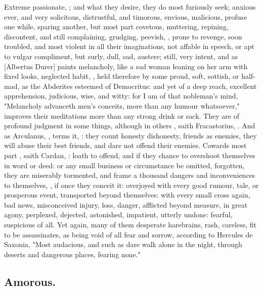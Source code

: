 {Extreme passionate, ; and what they desire,
they do most furiously seek; anxious ever, and very solicitous, distrustful,
and timorous, envious, malicious, profuse one while, sparing another, but most
part covetous, muttering, repining, discontent, and still complaining,
grudging, peevish, , prone to revenge, soon troubled,
and most violent in all their imaginations, not affable in speech, or apt to
vulgar compliment, but surly, dull, sad, austere;
 still, very intent, and as
[Albertus Durer] paints melancholy, like a sad woman leaning on
her arm with fixed looks, neglected habit, \etc{}, held
therefore by some proud, soft, sottish, or half-mad, as the Abderites esteemed
of Democritus: and yet of a deep reach, excellent apprehension, judicious,
wise, and witty: for I am of that nobleman's mind,
"Melancholy advanceth men's conceits, more than any humour whatsoever,"
improves their meditations more than any strong drink or sack. They are of
profound judgment in some things, although in others , saith Fracastorius, . And as
Arculanus, , terms it, : they count honesty dishonesty, friends as enemies, they
will abuse their best friends, and dare not offend their enemies. Cowards most
part , saith Cardan,
: loath to offend, and
if they chance to overshoot themselves in word or deed: or any small business
or circumstance be omitted, forgotten, they are miserably tormented, and frame
a thousand dangers and inconveniences to themselves, ,
if once they conceit it: overjoyed with every good rumour, tale, or prosperous
event, transported beyond themselves: with every small cross again, bad news,
misconceived injury, loss, danger, afflicted beyond measure, in great agony,
perplexed, dejected, astonished, impatient, utterly undone: fearful, suspicious
of all. Yet again, many of them desperate harebrains, rash, careless, fit to be
assassinates, as being void of all fear and sorrow, according to
Hercules de Saxonia, "Most audacious, and such as dare
walk alone in the night, through deserts and dangerous places, fearing none."

\subsection{Amorous.}

}
